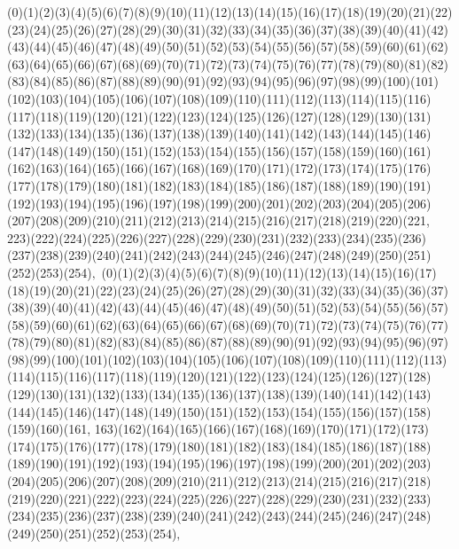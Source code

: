 \documentclass[12pt]{article}
\begin{document}
{(0)(1)(2)(3)(4)(5)(6)(7)(8)(9)(10)(11)(12)(13)(14)(15)(16)(17)(18)(19)(20)(21)(22)(23)(24)(25)(26)(27)(28)(29)(30)(31)(32)(33)(34)(35)(36)(37)(38)(39)(40)(41)(42)(43)(44)(45)(46)(47)(48)(49)(50)(51)(52)(53)(54)(55)(56)(57)(58)(59)(60)(61)(62)(63)(64)(65)(66)(67)(68)(69)(70)(71)(72)(73)(74)(75)(76)(77)(78)(79)(80)(81)(82)(83)(84)(85)(86)(87)(88)(89)(90)(91)(92)(93)(94)(95)(96)(97)(98)(99)(100)(101)(102)(103)(104)(105)(106)(107)(108)(109)(110)(111)(112)(113)(114)(115)(116)(117)(118)(119)(120)(121)(122)(123)(124)(125)(126)(127)(128)(129)(130)(131)(132)(133)(134)(135)(136)(137)(138)(139)(140)(141)(142)(143)(144)(145)(146)(147)(148)(149)(150)(151)(152)(153)(154)(155)(156)(157)(158)(159)(160)(161)(162)(163)(164)(165)(166)(167)(168)(169)(170)(171)(172)(173)(174)(175)(176)(177)(178)(179)(180)(181)(182)(183)(184)(185)(186)(187)(188)(189)(190)(191)(192)(193)(194)(195)(196)(197)(198)(199)(200)(201)(202)(203)(204)(205)(206)(207)(208)(209)(210)(211)(212)(213)(214)(215)(216)(217)(218)(219)(220)(221, 223)(222)(224)(225)(226)(227)(228)(229)(230)(231)(232)(233)(234)(235)(236)(237)(238)(239)(240)(241)(242)(243)(244)(245)(246)(247)(248)(249)(250)(251)(252)(253)(254)$
, 
$
(0)(1)(2)(3)(4)(5)(6)(7)(8)(9)(10)(11)(12)(13)(14)(15)(16)(17)(18)(19)(20)(21)(22)(23)(24)(25)(26)(27)(28)(29)(30)(31)(32)(33)(34)(35)(36)(37)(38)(39)(40)(41)(42)(43)(44)(45)(46)(47)(48)(49)(50)(51)(52)(53)(54)(55)(56)(57)(58)(59)(60)(61)(62)(63)(64)(65)(66)(67)(68)(69)(70)(71)(72)(73)(74)(75)(76)(77)(78)(79)(80)(81)(82)(83)(84)(85)(86)(87)(88)(89)(90)(91)(92)(93)(94)(95)(96)(97)(98)(99)(100)(101)(102)(103)(104)(105)(106)(107)(108)(109)(110)(111)(112)(113)(114)(115)(116)(117)(118)(119)(120)(121)(122)(123)(124)(125)(126)(127)(128)(129)(130)(131)(132)(133)(134)(135)(136)(137)(138)(139)(140)(141)(142)(143)(144)(145)(146)(147)(148)(149)(150)(151)(152)(153)(154)(155)(156)(157)(158)(159)(160)(161, 163)(162)(164)(165)(166)(167)(168)(169)(170)(171)(172)(173)(174)(175)(176)(177)(178)(179)(180)(181)(182)(183)(184)(185)(186)(187)(188)(189)(190)(191)(192)(193)(194)(195)(196)(197)(198)(199)(200)(201)(202)(203)(204)(205)(206)(207)(208)(209)(210)(211)(212)(213)(214)(215)(216)(217)(218)(219)(220)(221)(222)(223)(224)(225)(226)(227)(228)(229)(230)(231)(232)(233)(234)(235)(236)(237)(238)(239)(240)(241)(242)(243)(244)(245)(246)(247)(248)(249)(250)(251)(252)(253)(254)$
, 
$
}
\end{document}

